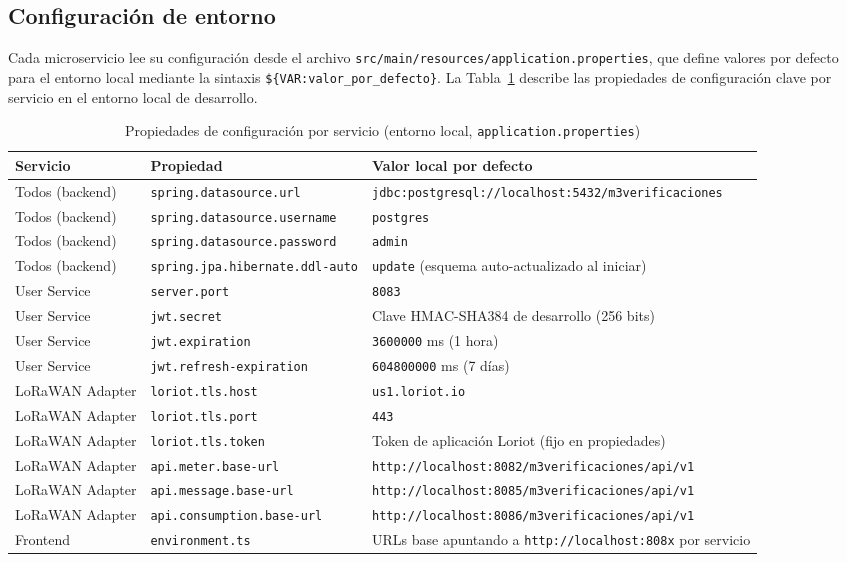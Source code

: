 \documentclass[12pt,a4paper,oneside]{report}
\begin{document}
\subsection{Configuración de entorno}\label{subsec:env}

Cada microservicio lee su configuración desde el archivo \texttt{src/main/resources/application.properties}, que define valores por defecto para el entorno local mediante la sintaxis \texttt{\$\{VAR:valor\_por\_defecto\}}. La Tabla~\ref{tab:envvars} describe las propiedades de configuración clave por servicio en el entorno local de desarrollo.

\begin{table}[H]
\caption{Propiedades de configuración por servicio (entorno local, \texttt{application.properties})}\label{tab:envvars}
\centering
\begin{tabularx}{\textwidth}{llX}
\toprule
\textbf{Servicio} & \textbf{Propiedad} & \textbf{Valor local por defecto} \\
\midrule
Todos (backend) & \texttt{spring.datasource.url} & \texttt{jdbc:postgresql://localhost:5432/m3verificaciones} \\
Todos (backend) & \texttt{spring.datasource.username} & \texttt{postgres} \\
Todos (backend) & \texttt{spring.datasource.password} & \texttt{admin} \\
Todos (backend) & \texttt{spring.jpa.hibernate.ddl-auto} & \texttt{update} (esquema auto-actualizado al iniciar) \\
User Service & \texttt{server.port} & \texttt{8083} \\
User Service & \texttt{jwt.secret} & Clave HMAC-SHA384 de desarrollo (256 bits) \\
User Service & \texttt{jwt.expiration} & \texttt{3600000} ms (1 hora) \\
User Service & \texttt{jwt.refresh-expiration} & \texttt{604800000} ms (7 días) \\
LoRaWAN Adapter & \texttt{loriot.tls.host} & \texttt{us1.loriot.io} \\
LoRaWAN Adapter & \texttt{loriot.tls.port} & \texttt{443} \\
LoRaWAN Adapter & \texttt{loriot.tls.token} & Token de aplicación Loriot (fijo en propiedades) \\
LoRaWAN Adapter & \texttt{api.meter.base-url} & \texttt{http://localhost:8082/m3verificaciones/api/v1} \\
LoRaWAN Adapter & \texttt{api.message.base-url} & \texttt{http://localhost:8085/m3verificaciones/api/v1} \\
LoRaWAN Adapter & \texttt{api.consumption.base-url} & \texttt{http://localhost:8086/m3verificaciones/api/v1} \\
Frontend & \texttt{environment.ts} & URLs base apuntando a \texttt{http://localhost:808x} por servicio \\
\bottomrule
\end{tabularx}
\end{table}
\end{document}
